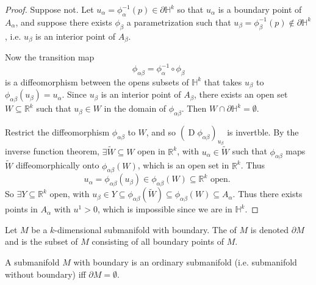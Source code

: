\documentclass[notoc,notitlepage]{tufte-book}
\DeclareMathOperator{\D}{D}
\begin{document}
\begin{proof}
  Suppose not. Let $u_\alpha = \phi_\alpha^{-1}(p) \in \partial \mathbb{H}^k$ so
  that $u_\alpha$ is a boundary point of $A_\alpha$, and suppose there exists
  $\phi_\beta$ a parametrization such that $u_\beta = \phi_\beta^{-1}(p) \notin
  \partial \mathbb{H}^k$, i.e. $u_\beta$ is an interior point of $A_\beta$.

  Now the transition map
  \begin{equation*}
    \phi_{\alpha\beta} = \phi_\alpha^{-1} \circ \phi_\beta
  \end{equation*}
  is a diffeomorphism between the opens subsets of $\mathbb{H}^k$ that takes
  $u_\beta$ to $\phi_{\alpha\beta}(u_\beta) = u_\alpha$. Since $u_\beta$ is an
  interior point of $A_\beta$, there exists an open set $W \subseteq
  \mathbb{R}^k$ such that $u_\beta \in W$ in the domain of $\phi_{\alpha\beta}$.
  Then $W \cap \partial \mathbb{H}^k = \emptyset$.

  Restrict the diffeomorphism $\phi_{\alpha\beta}$ to $W$, and so $(\D
  \phi_{\alpha\beta})_{u_\beta}$ is invertble. By the inverse function theorem,
  $\exists \tilde{W} \subseteq W$ open in $\mathbb{R}^k$, with $u_\alpha \in
  \tilde{W}$ such that $\phi_{\alpha\beta}$ maps $\tilde{W}$ diffeomorphically
  onto $\phi_{\alpha\beta}(W)$, which is an open set in $\mathbb{R}^k$. Thus
  \begin{equation*}
    u_\alpha = \phi_{\alpha\beta}(u_\beta) \in \phi_{\alpha\beta} (W) \subseteq
    \mathbb{R}^k \text{ open. }
  \end{equation*}
  So $\exists Y \subseteq \mathbb{R}^k$ open, with $u_\beta \in Y \subseteq
  \phi_{\alpha\beta}(\tilde{W}) \subseteq \phi_{\alpha\beta}(W) \subseteq
  A_{\alpha}$. Thus there exists points in $A_\alpha$ with $u^1 > 0$, which is
  impossible since we are in $\mathbb{H}^k$.
\end{proof}

\begin{defn}\label{defn:boundary_of_a_submanifold}
  Let $M$ be a $k$-dimensional submanifold with boundary. The 
  of $M$ is denoted $\partial M$ and is the subset of $M$ consisting of all
  boundary points of $M$.
\end{defn}

\begin{note}
  A submanifold $M$ with boundary is an ordinary submanifold (i.e. submanifold
  without boundary) iff $\partial M = \emptyset$.
\end{note}
\end{document}
